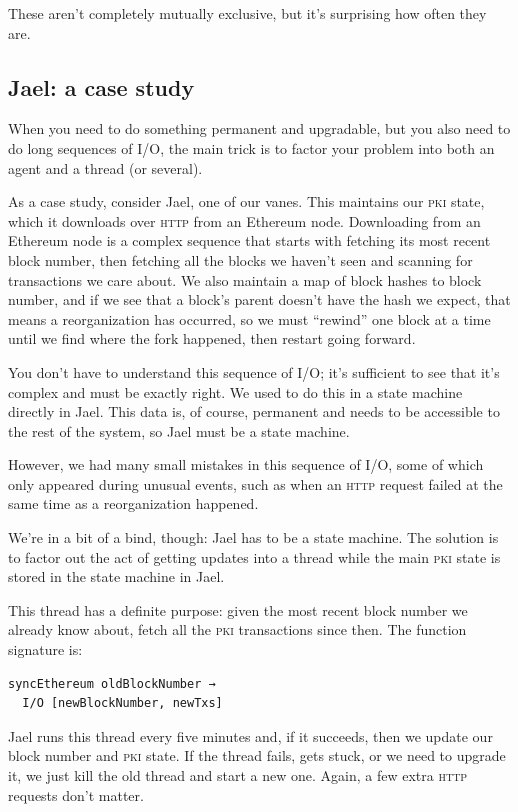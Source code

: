 \documentclass[twoside]{article}
\begin{document}
These aren't completely mutually exclusive, but it's surprising how
often they are.

\subsection{Jael: a case study}\label{jael-a-case-study}

When you need to do something permanent and upgradable, but you also
need to do long sequences of I/O, the main trick is to factor your
problem into both an agent and a thread (or several).

As a case study, consider Jael, one of our vanes. This maintains our \textsc{pki}
state, which it downloads over \textsc{http} from an Ethereum node. Downloading
from an Ethereum node is a complex sequence that starts with fetching
its most recent block number, then fetching all the blocks we haven't
seen and scanning for transactions we care about. We also maintain a map
of block hashes to block number, and if we see that a block's parent
doesn't have the hash we expect, that means a reorganization has
occurred, so we must ``rewind'' one block at a time until we find where
the fork happened, then restart going forward.

You don't have to understand this sequence of I/O; it's sufficient to see
that it's complex and must be exactly right. We used to do this in a
state machine directly in Jael. This data is, of course, permanent and
needs to be accessible to the rest of the system, so Jael must be a
state machine.

However, we had many small mistakes in this sequence of I/O, some of
which only appeared during unusual events, such as when an \textsc{http} request
failed at the same time as a reorganization happened.

We're in a bit of a bind, though: Jael has to be a state machine. The
solution is to factor out the act of getting updates into a thread while
the main \textsc{pki} state is stored in the state machine in Jael.

This thread has a definite purpose: given the most recent block number
we already know about, fetch all the \textsc{pki} transactions since then. The
function signature is:

\begin{lstlisting}[style=listingblock]
syncEthereum oldBlockNumber →
  I/O [newBlockNumber, newTxs]
\end{lstlisting}

Jael runs this thread every five minutes and, if it succeeds, then we
update our block number and \textsc{pki} state. If the thread fails, gets stuck,
or we need to upgrade it, we just kill the old thread and start a new
one. Again, a few extra \textsc{http} requests don't matter.
\end{document}
